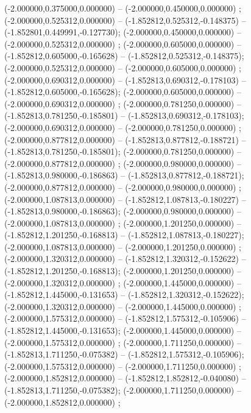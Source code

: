  (-2.000000,0.375000,0.000000) -- (-2.000000,0.450000,0.000000) ;
 (-2.000000,0.525312,0.000000) -- (-1.852812,0.525312,-0.148375) -- (-1.852801,0.449991,-0.127730);
 (-2.000000,0.450000,0.000000) -- (-2.000000,0.525312,0.000000) ;
 (-2.000000,0.605000,0.000000) -- (-1.852812,0.605000,-0.165628) -- (-1.852812,0.525312,-0.148375);
 (-2.000000,0.525312,0.000000) -- (-2.000000,0.605000,0.000000) ;
 (-2.000000,0.690312,0.000000) -- (-1.852813,0.690312,-0.178103) -- (-1.852812,0.605000,-0.165628);
 (-2.000000,0.605000,0.000000) -- (-2.000000,0.690312,0.000000) ;
 (-2.000000,0.781250,0.000000) -- (-1.852813,0.781250,-0.185801) -- (-1.852813,0.690312,-0.178103);
 (-2.000000,0.690312,0.000000) -- (-2.000000,0.781250,0.000000) ;
 (-2.000000,0.877812,0.000000) -- (-1.852813,0.877812,-0.188721) -- (-1.852813,0.781250,-0.185801);
 (-2.000000,0.781250,0.000000) -- (-2.000000,0.877812,0.000000) ;
 (-2.000000,0.980000,0.000000) -- (-1.852813,0.980000,-0.186863) -- (-1.852813,0.877812,-0.188721);
 (-2.000000,0.877812,0.000000) -- (-2.000000,0.980000,0.000000) ;
 (-2.000000,1.087813,0.000000) -- (-1.852812,1.087813,-0.180227) -- (-1.852813,0.980000,-0.186863);
 (-2.000000,0.980000,0.000000) -- (-2.000000,1.087813,0.000000) ;
 (-2.000000,1.201250,0.000000) -- (-1.852812,1.201250,-0.168813) -- (-1.852812,1.087813,-0.180227);
 (-2.000000,1.087813,0.000000) -- (-2.000000,1.201250,0.000000) ;
 (-2.000000,1.320312,0.000000) -- (-1.852812,1.320312,-0.152622) -- (-1.852812,1.201250,-0.168813);
 (-2.000000,1.201250,0.000000) -- (-2.000000,1.320312,0.000000) ;
 (-2.000000,1.445000,0.000000) -- (-1.852812,1.445000,-0.131653) -- (-1.852812,1.320312,-0.152622);
 (-2.000000,1.320312,0.000000) -- (-2.000000,1.445000,0.000000) ;
 (-2.000000,1.575312,0.000000) -- (-1.852812,1.575312,-0.105906) -- (-1.852812,1.445000,-0.131653);
 (-2.000000,1.445000,0.000000) -- (-2.000000,1.575312,0.000000) ;
 (-2.000000,1.711250,0.000000) -- (-1.852813,1.711250,-0.075382) -- (-1.852812,1.575312,-0.105906);
 (-2.000000,1.575312,0.000000) -- (-2.000000,1.711250,0.000000) ;
 (-2.000000,1.852812,0.000000) -- (-1.852812,1.852812,-0.040080) -- (-1.852813,1.711250,-0.075382);
 (-2.000000,1.711250,0.000000) -- (-2.000000,1.852812,0.000000) ;
